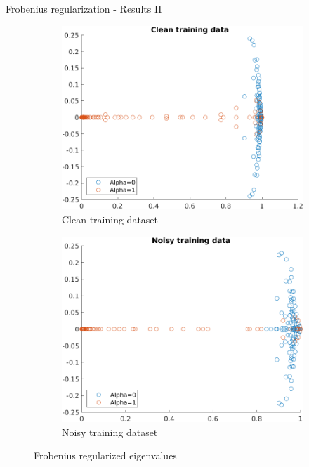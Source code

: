 \documentclass{beamer}
\begin{document}
\begin{frame}{Frobenius regularization - Results II}
    \begin{figure}
        \centering
        \begin{subfigure}[b]{0.45\textwidth}
            \centering
            \includegraphics[width=\textwidth]{Clean_Eigen.png}
            \caption{Clean training dataset}
            \label{fig:Eigen_clean}
        \end{subfigure}
        \hfill
        \begin{subfigure}[b]{0.45\textwidth}
            \centering
            \includegraphics[width=\textwidth]{Noisy_Eigen.png}
            \caption{Noisy training dataset}
            \label{fig:Eigen_noisy}
        \end{subfigure}
        \caption{Frobenius regularized eigenvalues}
        \label{fig:Eigen_Frobenius}
    \end{figure}
\end{frame}
\end{document}
